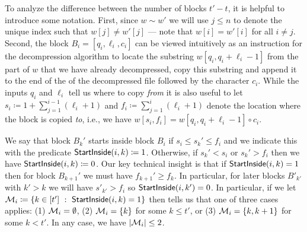 To analyze the difference between the number of blocks $t'-t$, it is helpful to introduce some notation. First, since $w \sim w'$ we will use $j \leq n$ to denote the unique index such that $w[j] \neq w'[j]$ --- note that $w[i] = w'[i]$ for all $i \neq j$. Second, the block $B_i=[q_i,\ell_i,c_i]$ can be viewed intuitively as an instruction for the decompression algorithm to locate the substring $w[q_i,q_i+\ell_i-1]$ from the part of $w$ that we have already decompressed, copy this substring and append it to the end of the of the decompressed file followed by the character $c_i$. While the inputs $q_i$ and $\ell_i$ tell us where to copy {\em from} it is also useful to let $s_i \coloneqq 1+\sum_{j=1}^{i-1} (\ell_i +1)$ and $f_i \coloneqq \sum_{j=1}^{i} (\ell_i +1)$ denote the location where the block is copied {\em to}, i.e., we have $w[s_i,f_i]  = w[q_i,q_i+\ell_i-1] \circ c_i$. 

We say that block $B_k'$ starts inside block $B_i$ if $s_i\leq s_k'\leq f_i$ and we indicate this with the predicate  $\mathsf{StartInside}(i,k)\coloneqq 1$. Otherwise, if $s_k' < s_i$ or $s_k' > f_i$ then we have  $\mathsf{StartInside}(i,k)\coloneqq 0$. Our key technical insight is that if $\mathsf{StartInside}(i,k)=1$ then for block $B_{k+1}'$ we must have $f_{k+1}' \geq f_k$. In particular, for later blocks $B'_{k'}$ with $k'>k$ we will have $s'_{k'} > f_i$ so $\mathsf{StartInside}(i,k')=0$. In particular, if we let $\mathcal{M}_i \coloneqq \{ k \in [t']~:~\mathsf{StartInside}(i,k)=1\}$ then    tells us that one of three cases applies: (1) $\mathcal{M}_i = \emptyset$, (2) $\mathcal{M}_i = \{k\}$ for some $k \leq t'$, or (3) $\mathcal{M}_i = \{k,k+1\}$ for some $k < t'$. In any case, we have $\left| \mathcal{M}_i \right| \leq 2$.





